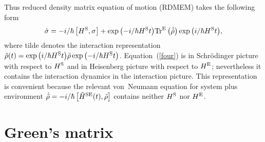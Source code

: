 \documentclass[12pt,twoside,a4paper]{report}
\begin{document}
Thus reduced density matrix equation of motion (RDMEM) takes the following form
 \begin{equation}
\dot{\sigma} =  -  i/\hbar \left[ H^{\rm S},\sigma \right]  
                          +  \exp{\left( - i/\hbar H^{\rm S}t\right)}  
                          {\rm Tr}^{\rm E} \left(         \dot{\tilde{\rho}}   \right)   
                              \exp{\left(  i/\hbar H^{\rm S}t \right)},   
\label{four} 
\end{equation} 
where  tilde denotes the interaction representation
$%
\tilde\rho(t) = 
\exp{\left( i/\hbar H^{\rm S}t\right)}  
               \bar \rho  
              \exp{\left( -i/\hbar H^{\rm S}t\right)}   
$. %
Equation~(\ref{four})
is in Schr\"odinger picture with respect to $H^{\rm S}$
and in Heisenberg picture with respect to $H^{\rm E}$;
nevertheless it contains 
the interaction dynamics %
in  the interaction picture.
This representation 
is convenient because the relevant
von~Neumann equation for system plus environment  
$%
\dot{\tilde{\rho}} = 
                          - i/\hbar  
                            \left[  
                               \tilde{H}^{\rm SE}(t) ,\tilde{\rho} 
                            \right] 
$ %
contains neither $H^{\rm S}$ nor $H^{\rm E}$.

\section{Green's matrix}\label{Green}
  
\end{document}
